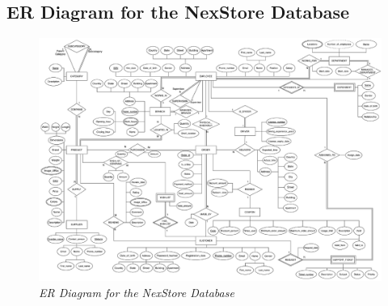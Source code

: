 \begin{landscape}
  \section{ER Diagram for the NexStore Database}
  \begin{figure}[H]
    \centering
    \includegraphics[width=1\textwidth]{images/diagrams/old-diagram.drawio.png}
    \caption{\textit{ER Diagram for the NexStore Database}}
  \end{figure}
\end{landscape}